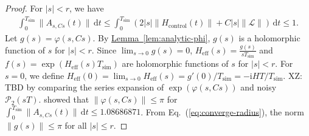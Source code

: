 \documentclass[11pt]{article}
\newcommand{\eq}[1]{(\ref{eq:#1})}
\newcommand{\lem}[1]{\hyperref[lem:#1]{Lemma~\ref*{lem:#1}}}
\renewcommand{\i}{\mathrm{i}}
\renewcommand{\d}{\mathrm{d}}
\renewcommand{\L}{\mathcal{L}}
\renewcommand{\P}{\mathcal{P}}
\newcommand{\simu}{\mathrm{sim}}
\newcommand{\Hc}{H_{\mathrm{control}}}
\newcommand{\He}{H_{\mathrm{eff}}}
\newcommand{\xz}[1]{{\color{cyan} XZ: #1}}
\begin{document}
\begin{proof}
    For $|s|< r$, we have \begin{align}
    \label{eq:converge-radius}
        \int_{0}^{T_{\simu}}\|A_{s,Cs}(t) \|\,\d t\le\int_{0}^{T_{\simu}}(2|s|\|\Hc(t)\|+C|s|\|\L\|)\, \d t\le 1.
    \end{align}
    Let $g(s) = \varphi(s, Cs)$. By \lem{analytic-phi}, $g(s)$ is a holomorphic function of $s$ for $|s|< r$. Since $\lim_{s\to 0}g(s)= 0$, 
    $\He(s)=\frac{g(s)}{sT_{\simu}}$ and $f(s) = \exp(\He(s)T_{\simu})$ are holomorphic functions of $s$ for $|s|< r$. For $s=0$, we define $\He(0) = \lim_{s\to 0} \He(s) = g'(0)/T_{\simu}= -\i HT/T_{\simu}$. \xz{TBD by comparing the series expansion of $\exp(\varphi(s, Cs))$ and noisy $\P_2(sT)$.}
    \citet{moan1998efficient} showed that $\|\varphi(s,C s)\|\le \pi$ for  $ \int_{0}^{T_{\simu}}\|A_{s, Cs}(t) \|\,\d t\le 1.08686871$. From Eq.~\eq{converge-radius}, the norm $\|g(s)\|\le \pi $ for all $|s|\le r$. 


\end{proof}
\end{document}

